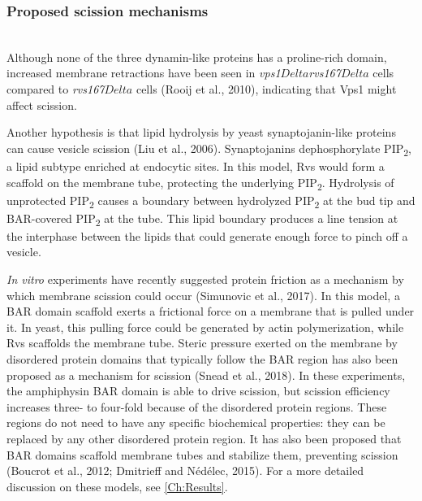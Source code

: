 
		
			\subsubsection{Proposed scission mechanisms}
			\mbox{}\\
			Although none of the three dynamin-like proteins has a proline-rich domain, increased membrane retractions have been seen in \textit{vps1$Delta$}\textit{rvs167$Delta$} cells compared to \textit{rvs167$Delta$}  cells (Rooij et al., 2010), indicating that Vps1 might affect scission. 

			\vspace{5mm}
Another hypothesis is that lipid hydrolysis by yeast synaptojanin-like proteins can cause vesicle scission (Liu et al., 2006). Synaptojanins dephosphorylate PIP\textsubscript{2}, a lipid subtype enriched at endocytic sites. In this model, Rvs would form a scaffold on the membrane tube, protecting the underlying PIP\textsubscript{2}. Hydrolysis of unprotected PIP\textsubscript{2} causes a boundary between hydrolyzed PIP\textsubscript{2} at the bud tip and BAR-covered PIP\textsubscript{2} at the tube. This lipid boundary produces a line tension at the interphase between the lipids that could generate enough force to pinch off a vesicle. 


			\vspace{5mm}
\textit{In vitro} experiments have recently suggested protein friction as a mechanism by which membrane scission could occur (Simunovic et al., 2017). In this model, a BAR domain scaffold exerts a frictional force on a membrane that is pulled under it. In yeast, this pulling force could be generated by actin polymerization, while Rvs scaffolds the membrane tube. 
Steric pressure exerted on the membrane by disordered protein domains that typically follow the BAR region has also been proposed as a mechanism for scission (Snead et al., 2018). In these experiments, the amphiphysin BAR domain is able to drive scission, but scission efficiency increases three- to four-fold because of the disordered protein regions. These regions do not need to have any specific biochemical properties: they can be replaced by any other disordered protein region. It has also been proposed that BAR domains scaffold membrane tubes and stabilize them, preventing scission (Boucrot et al., 2012; Dmitrieff and Nédélec, 2015). For a more detailed discussion on these models, see \ref{Ch:Results}.

